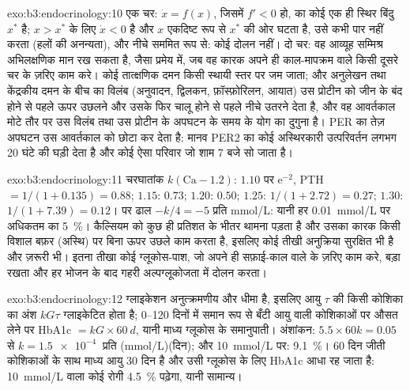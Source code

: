 \begin{solution}{exo:b3:endocrinology:10}
एक चर: $\dot x = f(x)$, जिसमें $f' < 0$ हो, का कोई एक ही स्थिर बिंदु
$x^{*}$ है; $x > x^{*}$ के लिए $\dot x < 0$ है और $x$ एकदिष्ट रूप से
$x^{*}$ की ओर घटता है, उसे कभी पार नहीं करता (हलों की अनन्यता), और नीचे
सममित रूप से: कोई दोलन नहीं। दो चर: वह आव्यूह सम्मिश्र अभिलक्षणिक मान
रख सकता है, जैसा प्रमेय में, जब वह कारक अपने ही काल-मापक्रम वाले किसी
दूसरे चर के ज़रिए काम करे। कोई तात्क्षणिक दमन किसी स्थायी स्तर पर जम
जाता; और अनुलेखन तथा केंद्रकीय दमन के बीच का विलंब (अनुवादन, द्विलकन,
फ़ॉस्फ़ोरिलन, आयात) उस प्रोटीन को जीन के बंद होने से पहले ऊपर उछलने और
उसके फिर चालू होने से पहले नीचे उतरने देता है, और वह आवर्तकाल मोटे तौर
पर उस विलंब तथा उस प्रोटीन के अपघटन के समय के योग का दुगुना है। PER का
तेज़ अपघटन उस आवर्तकाल को छोटा कर देता है: मानव PER2 का कोई अस्थिरकारी
उत्परिवर्तन लगभग 20 घंटे की घड़ी देता है और कोई ऐसा परिवार जो शाम 7 बजे
सो जाता है।
\end{solution}

\begin{solution}{exo:b3:endocrinology:11}
चरघातांक $k(\text{Ca} - 1.2)$: $1.10$ पर $\mathrm{e}^{-2}$, PTH $= 1/
(1 + 0.135) = 0.88$; $1.15$: $0.73$; $1.20$: $0.50$; $1.25$: $1/(1 +
2.72) = 0.27$; $1.30$: $1/(1 + 7.39) = 0.12$।  पर ढाल
$-k/4 = -5$ प्रति mmol/L: यानी हर \qty{0.01}{mmol/L} पर अधिकतम का
\qty{5}{\%}। कैल्सियम को कुछ ही प्रतिशत के भीतर थामना पड़ता है और उसका
कारक किसी विशाल बफ़र (अस्थि) पर बिना ऊपर उछले काम करता है, इसलिए कोई
तीखी अनुक्रिया सुरक्षित भी है और ज़रूरी भी। इतना तीखा कोई ग्लूकोस-पाश,
जो अपने ही सफ़ाई-काल वाले  के ज़रिए काम करे, बड़ा  रखता
और हर भोजन के बाद गहरी अल्पग्लूकोजता में दोलन करता।
\end{solution}

\begin{solution}{exo:b3:endocrinology:12}
ग्लाइकेशन अनुत्क्रमणीय और धीमा है, इसलिए आयु $\tau$ की किसी कोशिका का
अंश $kG\tau$ ग्लाइकेटित होता है; \numrange{0}{120} दिनों में समान रूप
से बँटी आयु वाली कोशिकाओं पर औसत लेने पर HbA1c $= kG\times\qty{60}{d}$,
यानी माध्य ग्लूकोस के समानुपाती। अंशांकन: $5.5\times 60k = 0.05$ से $k =
\qty{1.5e-4}{}$ प्रति (mmol/L)(दिन); और \qty{10}{mmol/L} पर:
\qty{9.1}{\%}। 60 दिन जीती कोशिकाओं के साथ माध्य आयु 30 दिन है और उसी
ग्लूकोस के लिए HbA1c आधा रह जाता है: \qty{10}{mmol/L} वाला कोई रोगी
\qty{4.5}{\%} पढ़ेगा, यानी सामान्य।
\end{solution}

